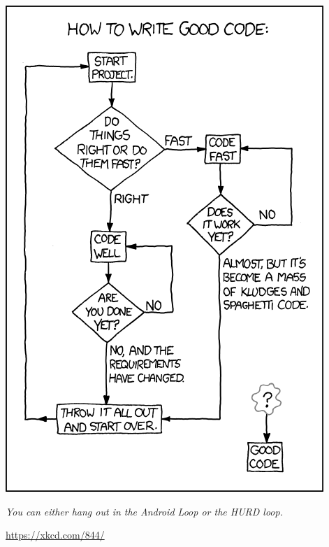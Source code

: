 \begin{frame}
%
\begin{center}
%
\begin{minipage}{6cm}
\includegraphics[height=\textheight]{./gfx/01-xkcd-good-code}
\end{minipage}
%
\begin{minipage}[c]{4cm}
\scriptsize
\emph{You can either hang out in the Android Loop or the HURD loop.}
\vspace{4pt}

\url{https://xkcd.com/844/}
\end{minipage}
%
\end{center}
%
\end{frame}


